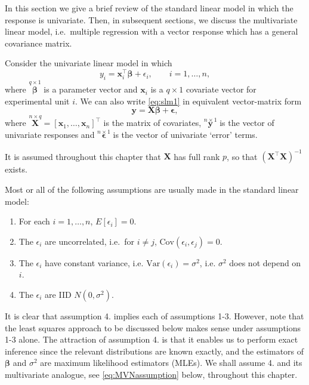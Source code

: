 \documentclass[]{book}
\theoremstyle{definition}
\theoremstyle{definition}
\theoremstyle{definition}
\theoremstyle{remark}
\begin{document}
In this section we give a brief review of the standard linear model in which the response is univariate. Then, in subsequent sections, we discuss the multivariate linear model, i.e.~multiple regression with a vector response which has a general covariance matrix.

Consider the univariate linear model in which
\begin{equation}
y_i = \boldsymbol x_i^\top {\pmb \beta}+\epsilon_i, \qquad i=1, \ldots , n,
\label{eq:slm1}
\end{equation}
where \(\stackrel{q \times 1}{\pmb \beta}\) is a parameter vector and \(\boldsymbol x_i\) is a \(q \times 1\) covariate vector for experimental unit \(i\). We can also write \eqref{eq:slm1} in equivalent vector-matrix form
\begin{equation}
\boldsymbol y=\boldsymbol X{\pmb \beta} +{\pmb \epsilon},
\label{eq:slm2}
\end{equation}
where \(\stackrel{n \times q}{\boldsymbol X}=[\boldsymbol x_1 , \ldots , \boldsymbol x_n]^\top\) is the matrix of covariates,
\(\stackrel{n \times 1}{\boldsymbol y}\) is the vector of univariate responses and \(\stackrel{n \times 1}{\pmb \epsilon}\) is the vector of univariate `error' terms.

It is assumed throughout this chapter that \(\boldsymbol X\) has full rank \(p\), so that \((\boldsymbol X^\top \boldsymbol X)^{-1}\) exists.

Most or all of the following assumptions are usually made in the standard linear model:

\begin{enumerate}
\def\labelenumi{\arabic{enumi}.}
\item
  For each \(i=1, \ldots , n\), \(E[\epsilon_i]=0\).
\item
  The \(\epsilon_i\) are uncorrelated, i.e.~for \(i \neq j\), \(\text{Cov}(\epsilon_i, \epsilon_j)=0\).
\item
  The \(\epsilon_i\) have constant variance, i.e. \(\text{Var}(\epsilon_i)=\sigma^2\), i.e. \(\sigma^2\) does not depend on \(i\).
\item
  The \(\epsilon_i\) are IID \(N(0, \sigma^2)\).
\end{enumerate}

It is clear that assumption 4. implies each of assumptions 1-3. However, note that the least squares approach to be discussed below makes sense under assumptions 1-3 alone. The attraction of assumption 4. is that it enables us to perform exact inference since the relevant distributions are known exactly, and the estimators of \({\pmb \beta}\) and \(\sigma^2\) are maximum likelihood estimators (MLEs). We shall assume 4. and its multivariate analogue, see \eqref{eq:MVNassumption} below, throughout this chapter.
\end{document}
